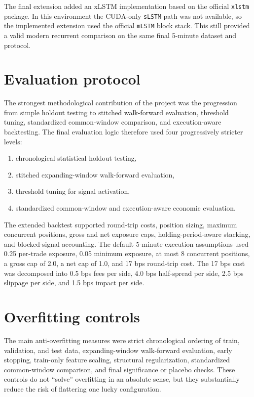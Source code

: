 \documentclass[12pt]{report}
\begin{document}
The final extension added an xLSTM implementation based on the official \texttt{xlstm} package. In this environment the CUDA-only \texttt{sLSTM} path was not available, so the implemented extension used the official \texttt{mLSTM} block stack. This still provided a valid modern recurrent comparison on the same final 5-minute dataset and protocol.

\section{Evaluation protocol}
The strongest methodological contribution of the project was the progression from simple holdout testing to stitched walk-forward evaluation, threshold tuning, standardized common-window comparison, and execution-aware backtesting. The final evaluation logic therefore used four progressively stricter levels:
\begin{enumerate}[leftmargin=1.2cm]
    \item chronological statistical holdout testing,
    \item stitched expanding-window walk-forward evaluation,
    \item threshold tuning for signal activation,
    \item standardized common-window and execution-aware economic evaluation.
\end{enumerate}

The extended backtest supported round-trip costs, position sizing, maximum concurrent positions, gross and net exposure caps, holding-period-aware stacking, and blocked-signal accounting. The default 5-minute execution assumptions used 0.25 per-trade exposure, 0.05 minimum exposure, at most 8 concurrent positions, a gross cap of 2.0, a net cap of 1.0, and 17 bps round-trip cost. The 17 bps cost was decomposed into 0.5 bps fees per side, 4.0 bps half-spread per side, 2.5 bps slippage per side, and 1.5 bps impact per side.

\section{Overfitting controls}
The main anti-overfitting measures were strict chronological ordering of train, validation, and test data, expanding-window walk-forward evaluation, early stopping, train-only feature scaling, structural regularization, standardized common-window comparison, and final significance or placebo checks. These controls do not ``solve'' overfitting in an absolute sense, but they substantially reduce the risk of flattering one lucky configuration.
\end{document}
